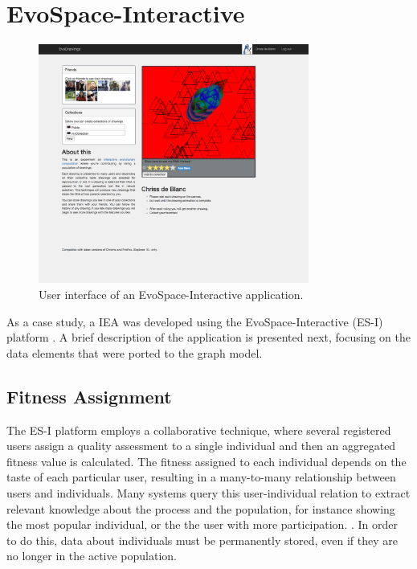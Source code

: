 \documentclass[conference]{IEEEtran}
\begin{document}
\section{EvoSpace-Interactive}
\label{sec:evospace-i}
\begin{figure}[!t]
    \centering
        \includegraphics[width=3.5in]{img/UI_ed01.png}
    \caption{User interface of an EvoSpace-Interactive application.}
    \label{fig:web}
\end{figure}

As a case study, a IEA was developed using the 
EvoSpace-Interactive (ES-I) platform \cite{garcia2013evospace}. %
A brief description of the application is presented next, focusing
on the data elements that were ported to the graph model.

\subsection{Fitness Assignment}
\label{sec:assignment}
The ES-I platform employs a collaborative technique,
where several registered users assign a quality assessment to a single
individual and then an aggregated fitness value is calculated. The fitness
assigned to each individual depends on the taste of each particular user, 
resulting in a many-to-many relationship between users and individuals. 
Many systems query this user-individual relation to extract relevant
knowledge about the process and the population, for instance showing the
most popular individual, or the the user with more participation.  
\cite{picbreeder}.
In order to do this, data about individuals 
must be permanently stored, even
if they are no longer in the active population. 
\end{document}
